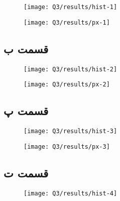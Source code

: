\documentclass[12pt,onecolumn,a4paper]{article}
\theoremstyle{definition}
\begin{document}
	
	\begin{figure}[H]
		\centering
		\texttt{[image: Q3/results/hist-1]}
		\caption{}
		\label{fig:hist-1}
	\end{figure}


		
	\begin{figure}[H]
		\centering
		\texttt{[image: Q3/results/px-1]}
		\caption{}
		\label{fig:px-1}
	\end{figure}
	

	\FloatBarrier
	\subsection{قسمت ب}
	
	
	\begin{figure}[H]
		\centering
		\texttt{[image: Q3/results/hist-2]}
		\caption{}
		\label{fig:hist-2}
	\end{figure}


		
	\begin{figure}[H]
		\centering
		\texttt{[image: Q3/results/px-2]}
		\caption{}
		\label{fig:px-2}
	\end{figure}
	
	
	\FloatBarrier
	\subsection{قسمت پ}

		
	\begin{figure}[H]
		\centering
		\texttt{[image: Q3/results/hist-3]}
		\caption{}
		\label{fig:hist-3}
	\end{figure}


		
	\begin{figure}[H]
		\centering
		\texttt{[image: Q3/results/px-3]}
		\caption{}
		\label{fig:px-3}
	\end{figure}
	

	
	\FloatBarrier
	\subsection{قسمت ت}

		
	\begin{figure}[H]
		\centering
		\texttt{[image: Q3/results/hist-4]}
		\caption{}
		\label{fig:hist-4}
	\end{figure}
\end{document}
